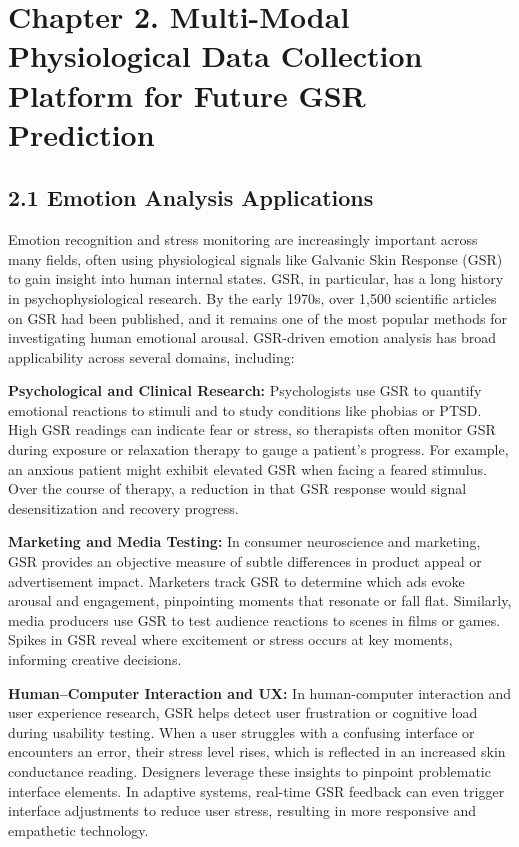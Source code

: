 \documentclass[11pt,a4paper]{report}
\begin{document}
\label{chap:2}

\chapter{Chapter 2. Multi-Modal Physiological Data Collection Platform for Future GSR Prediction}

\section{2.1 Emotion Analysis Applications}

Emotion recognition and stress monitoring are increasingly important across many fields, often using physiological signals like Galvanic Skin Response (GSR) to gain insight into human internal states. GSR, in particular, has a long history in psychophysiological research. By the early 1970s, over 1,500 scientific articles on GSR had been published, and it remains one of the most popular methods for investigating human emotional arousal\cite{Boucsein2012}. GSR-driven emotion analysis has broad applicability across several domains, including:

\textbf{Psychological and Clinical Research:} Psychologists use GSR to quantify emotional reactions to stimuli and to study conditions like phobias or PTSD. High GSR readings can indicate fear or stress, so therapists often monitor GSR during exposure or relaxation therapy to gauge a patient's progress\cite{AppleHealthWatch2019}\cite{SamsungHealth2020}. For example, an anxious patient might exhibit elevated GSR when facing a feared stimulus. Over the course of therapy, a reduction in that GSR response would signal desensitization and recovery progress.

\textbf{Marketing and Media Testing:} In consumer neuroscience and marketing, GSR provides an objective measure of subtle differences in product appeal or advertisement impact. Marketers track GSR to determine which ads evoke arousal and engagement, pinpointing moments that resonate or fall flat\cite{Fowles1981}\cite{Healey2005}. Similarly, media producers use GSR to test audience reactions to scenes in films or games. Spikes in GSR reveal where excitement or stress occurs at key moments, informing creative decisions.

\textbf{Human–Computer Interaction and UX:} In human-computer interaction and user experience research, GSR helps detect user frustration or cognitive load during usability testing. When a user struggles with a confusing interface or encounters an error, their stress level rises, which is reflected in an increased skin conductance reading\cite{Picard2001}. Designers leverage these insights to pinpoint problematic interface elements. In adaptive systems, real-time GSR feedback can even trigger interface adjustments to reduce user stress, resulting in more responsive and empathetic technology.
\end{document}
